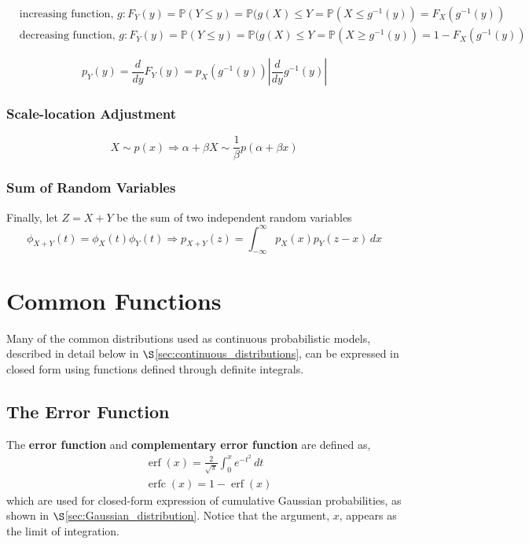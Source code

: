 \documentclass[12pt, twoside, draft]{article}
\begin{document}
\begin{align}
&\text{increasing function, }g: F_Y(y) = \mathbb{P}(Y \leq y) = \mathbb{P}(g(X) \leq Y = \mathbb{P}(X \leq g^{-1}(y)) = F_X(g^{-1}(y)) \\
&\text{decreasing function, }g: F_Y(y) = \mathbb{P}(Y \leq y) = \mathbb{P}(g(X) \leq Y = \mathbb{P}(X \geq g^{-1}(y)) = 1 - F_X(g^{-1}(y))
\end{align}

\begin{equation}\label{eq:general_transformation}
p_Y(y) = \frac{d}{dy}F_Y(y) = p_X(g^{-1}(y)) \left|\frac{d}{dy}g^{-1}(y) \right|
\end{equation}

\subsubsection{Scale-location Adjustment}\label{sec:scale-location_adjustment}

\begin{equation}
X \sim p(x) \Rightarrow \alpha + \beta X \sim \frac{1}{\beta}p(\alpha + \beta x)
\end{equation}

\subsubsection{Sum of Random Variables}

Finally, let $Z = X + Y$ be the sum of two independent random variables
\begin{equation}
\phi_{X+Y}(t) = \phi_X(t)\phi_Y(t) \Rightarrow p_{X+Y}(z) = \int_{-\infty}^{\infty}p_X(x)p_Y(z-x)\, dx
\end{equation}

\section{Common Functions}\label{sec:common_functions}
Many of the common distributions used as continuous probabilistic models, described in detail below in $\S$\ref{sec:continuous_distributions}, can be expressed in closed form using functions defined through definite integrals.

\subsection{The  Error Function}\label{sec:error_function}
The \textbf{error function} and \textbf{complementary error function} are defined as,
\begin{align}
&\operatorname{erf} (x) = \frac{2}{\sqrt{\pi}} \int_0^x e^{-t^2} \,dt \\
&\operatorname{erfc}(x) = 1 - \operatorname{erf}(x)
\end{align}
which are used for closed-form expression of cumulative Gaussian probabilities, as shown in $\S$\ref{sec:Gaussian_distribution}.  Notice that the argument, $x$, appears as the limit of integration.
\end{document}
